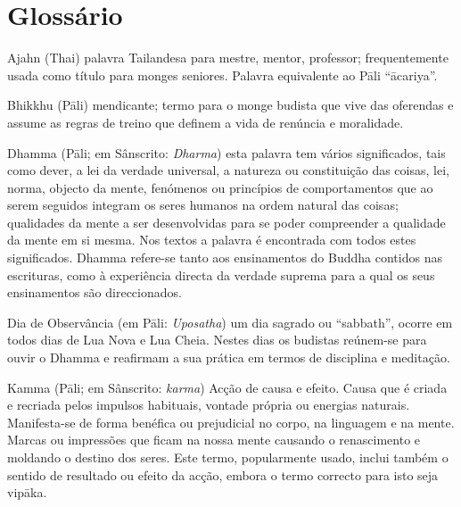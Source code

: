 \chapter{Glossário}

\begin{glossarydescription}


\item[Ajahn] (Thai) palavra Tailandesa para mestre, mentor, professor;
  frequentemente usada como título para monges seniores. Palavra equivalente ao
  Pāli “ācariya”.


\item[Bhikkhu] (Pāli) mendicante; termo para o monge budista que vive das
  oferendas e assume as regras de treino que definem a vida de renúncia e
  moralidade.



\item[Dhamma] (Pāli; em Sânscrito: \emph{Dharma}) esta palavra tem vários
  significados, tais como dever, a lei da verdade universal, a natureza ou
  constituição das coisas, lei, norma, objecto da mente, fenómenos ou princípios
  de comportamentos que ao serem seguidos integram os seres humanos na ordem
  natural das coisas; qualidades da mente a ser desenvolvidas para se poder
  compreender a qualidade da mente em si mesma. Nos textos a palavra é
  encontrada com todos estes significados. Dhamma refere-se tanto aos
  ensinamentos do Buddha contidos nas escrituras, como à experiência directa da
  verdade suprema para a qual os seus ensinamentos são direccionados.

\item[Dia de Observância] (em Pāli: \emph{Uposatha}) um dia sagrado ou
  “sabbath”, ocorre em todos dias de Lua Nova e Lua Cheia. Nestes dias os
  budistas reúnem-se para ouvir o Dhamma e reafirmam a sua prática em termos de
  disciplina e meditação.








\item[Kamma] (Pāli; em Sânscrito: \emph{karma}) Acção de causa e efeito. Causa que é
  criada e recriada pelos impulsos habituais, vontade própria ou energias
  naturais. Manifesta-se de forma benéfica ou prejudicial no corpo, na linguagem
  e na mente. Marcas ou impressões que ficam na nossa mente causando o
  renascimento e moldando o destino dos seres. Este termo, popularmente usado,
  inclui também o sentido de resultado ou efeito da acção, embora o termo
  correcto para isto seja vipāka.


\end{glossarydescription}

